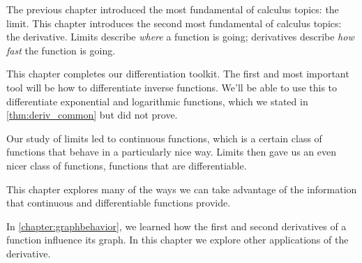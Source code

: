 
The previous chapter introduced the most fundamental of calculus topics: the limit. This chapter introduces the second most fundamental of calculus topics: the derivative. Limits describe \textit{where} a function is going; derivatives describe \textit{how fast} the function is going.










This chapter completes our differentiation toolkit.  The first and most important tool will be how to differentiate inverse functions.  We'll be able to use this to differentiate exponential and logarithmic functions, which we stated in \autoref{thm:deriv_common} but did not prove.








Our study of limits led to continuous functions, which is a certain class of functions that behave in a particularly nice way. Limits then gave us an even nicer class of functions, functions that are differentiable.

This chapter explores many of the ways we can take advantage of the information that continuous and differentiable functions  provide.









In \autoref{chapter:graphbehavior}, we learned how the first and second derivatives of a function influence its graph. In this chapter we explore other applications of the derivative.







